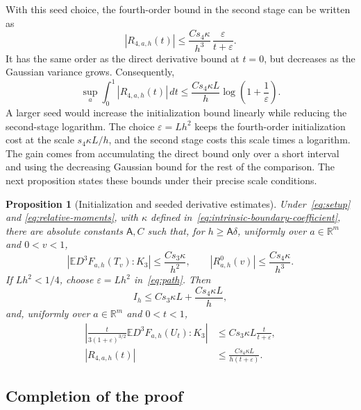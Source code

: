 \documentclass[11pt,letterpaper,twoside,leqno]{article}
\theoremstyle{bookplain}
\newtheorem{proposition}{Proposition}
\theoremstyle{bookremark}
\newcommand{\E}{\mathbb E}
\newcommand{\R}{\mathbb R}
\begin{document}
{{With this seed choice, the fourth-order bound in the second stage
can be written as
\[
 |R_{4,a,h}(t)|
 \le \frac{Cs_4{\kappa}}{h^3}\,
       \frac{\varepsilon}{t+\varepsilon}.
\]
It has the same order as the direct derivative bound at \(t=0\),
but decreases as the Gaussian variance grows. Consequently,
\[
 \sup_a\int_0^1|R_{4,a,h}(t)|\,dt
 \le \frac{Cs_4{\kappa L}}h
       \log\!\left(1+\frac1\varepsilon\right).
\]
A larger seed would increase the initialization bound linearly while
reducing the second-stage logarithm. The choice \(\varepsilon=Lh^2\)
keeps the fourth-order initialization cost at the scale
\(s_4{\kappa L}/h\), and the second stage costs this scale times a
logarithm. The gain comes from accumulating the direct bound only
over a short interval and using the decreasing Gaussian bound for
the rest of the comparison.
The next proposition states these bounds under their precise
scale conditions.
}

}

\begin{proposition}[Initialization and seeded derivative estimates]
\label{an:prop:derivative}
{Under~\eqref{eq:setup} and \eqref{eq:relative-moments}, with
\(\kappa\) defined in~\eqref{eq:intrinsic-boundary-coefficient}, there are absolute constants} \(\mathsf A,C\)
such that, for \(h\ge\mathsf A\delta\), uniformly over
\(a\in\R^m\) and \(0<v<1\),
\begin{equation}
 |\E D^3F_{a,h}(T_v):K_3|\le\frac{Cs_3{\kappa}}{h^2},
 \qquad |R^0_{a,h}(v)|\le\frac{Cs_4{\kappa}}{h^3}.
 \label{eq:direct-initialization}
\end{equation}
If \(Lh^2<1/4\), choose \(\varepsilon=Lh^2\) in~\eqref{eq:path}.
Then
\begin{equation}
 I_h\le Cs_3 {\kappa L}+\frac{Cs_4{\kappa L}}h,
 \label{eq:initialization-bound}
\end{equation}
and, uniformly over \(a\in\R^m\) and \(0<t<1\),
\begin{equation}
 \begin{aligned}
 \left|\frac{t}{3(1+\varepsilon)^{3/2}}
          \E D^3F_{a,h}(U_t):K_3\right|
 &\le Cs_3 {\kappa L}\frac{t}{t+\varepsilon},\\
 |R_{4,a,h}(t)|&\le\frac{Cs_4{\kappa L}}{h(t+\varepsilon)}.
 \end{aligned}
 \label{eq:seeded-derivatives}
\end{equation}

\end{proposition}
\subsection{{Completion of the proof}}\label{sec:proof-theorem-one}
\end{document}

